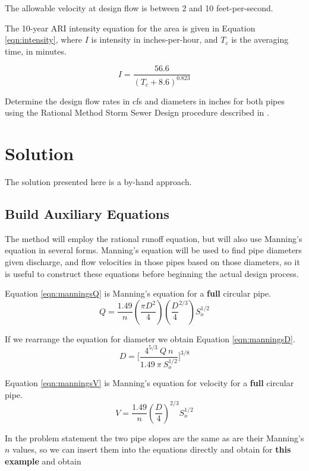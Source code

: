 \documentclass[12pt]{article}
\begin{document}
The allowable velocity at design flow is between 2 and 10 feet-per-second.

The 10-year ARI intensity equation for the area is given in Equation \ref{eqn:intensity}, where $I$ is intensity in inches-per-hour, and $T_c$ is the averaging time, in minutes.

\begin{equation}
I = \frac{56.6}{(T_c + 8.6)^{0.823}}
\label{eqn:intensity}
\end{equation}
 
Determine the design flow rates in cfs and diameters in inches for both pipes using the Rational Method Storm Sewer Design procedure described in \cite{mays2011}.

\section*{Solution}
The solution presented here is a by-hand approach.
\subsection*{Build Auxiliary Equations}
The method will employ the rational runoff equation, but will also use Manning's equation in several forms.  
Manning's equation will be used to find pipe diameters given discharge, and flow velocities in those pipes based on those diameters, so it is useful to construct these equations before beginning the actual design process.

Equation \ref{eqn:manningsQ} is Manning's equation for a \textbf{full} circular pipe.
\begin{equation}
Q = \frac{1.49}{n} (\frac{\pi D^2}{4})(\frac{D}{4}^{2/3}) S_o^{1/2}
\label{eqn:manningsQ}
\end{equation}

If we rearrange the equation for diameter we obtain Equation \ref{eqn:manningsD}.
\begin{equation}
D = \big[\frac{4^{5/3}~Q~n}{1.49~\pi~S_o^{1/2}}]^{3/8}
\label{eqn:manningsD}
\end{equation}

Equation \ref{eqn:manningsV} is Manning's equation for velocity for a \textbf{full} circular pipe.
\begin{equation}
V = \frac{1.49}{n}(\frac{D}{4})^{2/3} S_o^{1/2}
\label{eqn:manningsV}
\end{equation}

In the problem statement the two pipe slopes are the same as are their Manning's $n$ values, so we can insert them into the equations directly and obtain for \textbf{this example} and obtain
\end{document}
